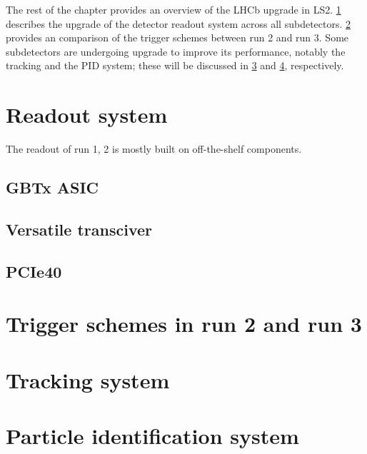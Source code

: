The rest of the chapter provides an overview of the LHCb upgrade in LS2.
\cref{ref:lhcb-upgrade-overview:readout} describes the upgrade of the detector
readout system across all subdetectors.
\cref{ref:lhcb-upgrade-overview:trigger}
provides an comparison of the trigger schemes between run 2 and run 3.
Some subdetectors are undergoing upgrade to improve its performance, notably
the tracking and the PID system;
these will be discussed in \cref{ref:lhcb-upgrade-overview:tracking} and
\cref{ref:lhcb-upgrade-overview:pid}, respectively.


\section{Readout system}
\label{ref:lhcb-upgrade-overview:readout}

The readout of run 1, 2 is mostly built on off-the-shelf components.




\subsection{GBTx ASIC}


\subsection{Versatile transciver}


\subsection{PCIe40}


\section{Trigger schemes in run 2 and run 3}
\label{ref:lhcb-upgrade-overview:trigger}


\section{Tracking system}
\label{ref:lhcb-upgrade-overview:tracking}



\section{Particle identification system}
\label{ref:lhcb-upgrade-overview:pid}


